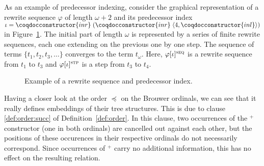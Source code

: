 As an example of predecessor indexing, consider the graphical
representation of a rewrite sequence $\varphi$ of length $\omega + 2$
and its predecessor index $\iota = \coqdocconstructor{inr} \;
(\coqdocconstructor{inr} \; \langle 4,
\coqdocconstructor{inl}\rangle)$ in Figure~\ref{fig:pred}. The initial
part of length $\omega$ is represented by a series of finite rewrite
sequences, each one extending on the previous one by one step. The
sequence of terms $\{ t_1,t_2, t_3, \ldots \}$ converges to the term
$t_\omega$. Here, $\varphi[\iota]^\textsc{seq}$ is a rewrite sequence
from $t_1$ to $t_3$ and $\varphi[\iota]^\textsc{stp}$ is a step from
$t_3$ to $t_4$.

\begin{figure}
\begin{center}
\begin{tikzpicture}

\end{tikzpicture}
\end{center}
\caption{Example of a rewrite sequence and predecessor
  index.}\label{fig:pred}
\end{figure}

Having a closer look at the order $\preceq$ on the Brouwer ordinals, we can
see that it really defines embeddings of their tree structures. This is due to
clause {\sc \ref{def:order:succ}} of Definition~\ref{def:order}. In
this clause, two occurrences of the $^+$ constructor (one in both
ordinals) are cancelled out against each other, but the positions of
these occurences in their respective ordinals do not necessarily
correspond. Since occurrences of $^+$ carry no additional information,
this has no effect on the resulting relation.

